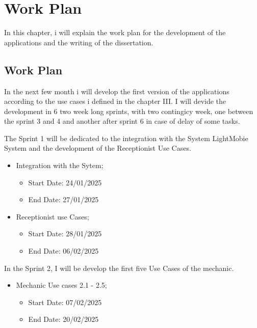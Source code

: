 \chapter{Work Plan}%
\label{chapter:workPlan}

\begin{introduction}
In this chapter, i will explain the work plan for the development of the applications and the writing of the dissertation.
\end{introduction} 


\section{Work Plan}

In the next few month i will develop the first version of the applications according to the use cases i defined in the chapter III. 
I will devide the development in 6 two week long sprints, with two contingicy week, one between the sprint 3 and 4 and another after sprint 6 in case of delay of some tasks.

The Sprint 1 will be dedicated to the integration with the System LightMobie System and the development of the Receptionist Use Cases.  

\begin{itemize}
  \item Integration with the Sytem;
  \begin{itemize}
      \item Start Date: 24/01/2025 
      \item End Date: 27/01/2025 
  \end{itemize}
    \item Receptionist use Cases;
    \begin{itemize}
        \item Start Date: 28/01/2025 
        \item End Date: 06/02/2025 
    \end{itemize}
  \end{itemize}

In the Sprint 2, I will be develop the first five Use Cases of the mechanic.  

\begin{itemize}
  \item Mechanic Use cases 2.1 - 2.5;
    \begin{itemize}
      \item Start Date: 07/02/2025 
      \item End Date: 20/02/2025 
  \end{itemize}
\end{itemize}

